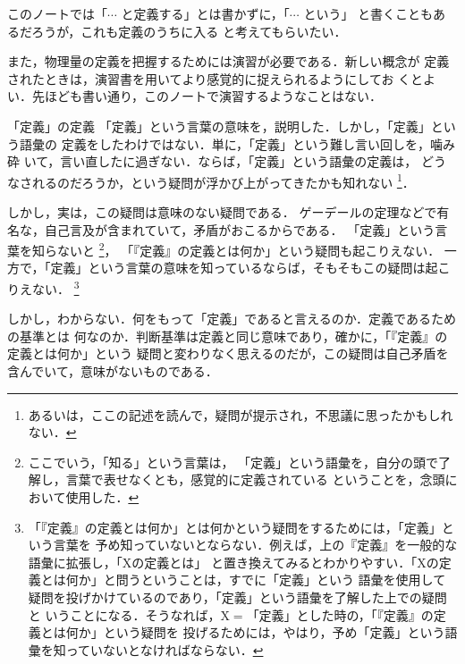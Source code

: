                 このノートでは「$\cdots$ と定義する」とは書かずに，「$\cdots$ という」
                と書くこともあるだろうが，これも定義のうちに入る と考えてもらいたい．

                また，物理量の定義を把握するためには演習が必要である．新しい概念が
                定義されたときは，演習書を用いてより感覚的に捉えられるようにしてお
                くとよい．先ほども書い通り，このノートで演習するようなことはない．

            \begin{memo}{「定義」の定義}
                「定義」という言葉の意味を，説明した．しかし，「定義」という語彙の
                定義をしたわけではない．単に，「定義」という難し言い回しを，噛み砕
                いて，言い直したに過ぎない．ならば，「定義」という語彙の定義は，
                どうなされるのだろうか，という疑問が浮かび上がってきたかも知れない
                    \footnote{
                        あるいは，ここの記述を読んで，疑問が提示され，不思議に思ったかもしれない．
                    }．


                しかし，実は，この疑問は意味のない疑問である．
                ゲーデールの定理などで有名な，自己言及が含まれていて，矛盾がおこるからである．
                「定義」という言葉を知らないと
                    \footnote{
                    ここでいう，「知る」という言葉は，
                    「定義」という語彙を，自分の頭で了解し，言葉で表せなくとも，感覚的に定義されている
                    ということを，念頭において使用した．
                    }，
                「『定義』の定義とは何か」という疑問も起こりえない．
                一方で，「定義」という言葉の意味を知っているならば，そもそもこの疑問は起こりえない．
                    \footnote{
                        「『定義』の定義とは何か」とは何かという疑問をするためには，「定義」という言葉を
                        予め知っていないとならない．例えば，上の『定義』を一般的な語彙に拡張し，「Xの定義とは」
                        と置き換えてみるとわかりやすい．「Xの定義とは何か」と問うということは，すでに「定義」という
                        語彙を使用して疑問を投げかけているのであり，「定義」という語彙を了解した上での疑問と
                        いうことになる．そうなれば，X$=$「定義」とした時の，「『定義』の定義とは何か」という疑問を
                        投げるためには，やはり，予め「定義」という語彙を知っていないとなければならない．
                    }

                しかし，わからない．何をもって「定義」であると言えるのか．定義であるための基準とは
                何なのか．判断基準は定義と同じ意味であり，確かに，「『定義』の定義とは何か」という
                疑問と変わりなく思えるのだが，この疑問は自己矛盾を含んでいて，意味がないものである．


\end{memo}
